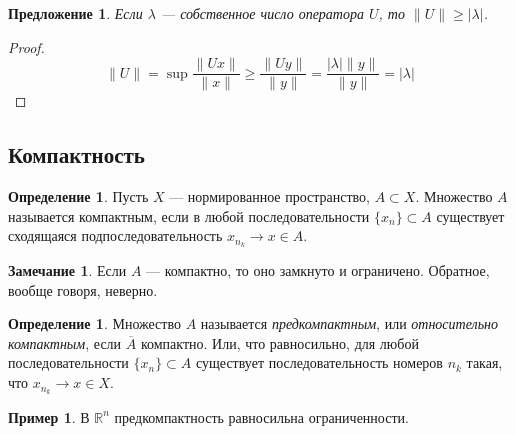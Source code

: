 \documentclass[11pt,openany,a4paper]{scrartcl}
\theoremstyle{plain}
\newtheorem{proposition}[theorem]{Предложение}
\theoremstyle{definition}
\newtheorem{definition}[theorem]{Определение}
\newtheorem{remark}[theorem]{Замечание}
\newtheorem{example}[theorem]{Пример}
\newcommand\mb{\mathbb}
\newcommand\real{\mb R}
\newcommand\ol{\overline}
\begin{document}
\begin{proposition}
    Если $\lambda$ — собственное число оператора $U$, то
    $\|U\| \geqslant |\lambda|$.
\end{proposition}
\begin{proof}
    $$
    \|U\| = \sup \frac{\|Ux\|}{\|x\|} \geqslant \frac{\|Uy\|}{\|y\|} =
    \frac{|\lambda|\|y\|}{\|y\|} = |\lambda|
    $$
\end{proof}

\subsection{Компактность}

\begin{definition}
    Пусть $X$ — нормированное пространство, $A\subset X$. Множество $A$ называется 
    компактным, если в любой последовательности $\{x_n\} \subset A$ существует сходящаяся
    подпоследовательность $x_{n_k} \to x \in A$.
\end{definition}
\begin{remark}
    Если $A$ — компактно, то оно замкнуто и ограничено. Обратное, вообще говоря, неверно.
\end{remark}
\begin{definition}
    Множество $A$ называется \emph{предкомпактным}, или \emph{относительно компактным}, если
    $\ol A$ компактно. Или, что равносильно, для любой последовательности $\{x_n\} \subset A$
    существует последовательность номеров $n_k$ такая, что $x_{n_k} \to x \in X$.
\end{definition}

\begin{example}
    В $\real^n$ предкомпактность равносильна ограниченности.
\end{example}
\end{document}
